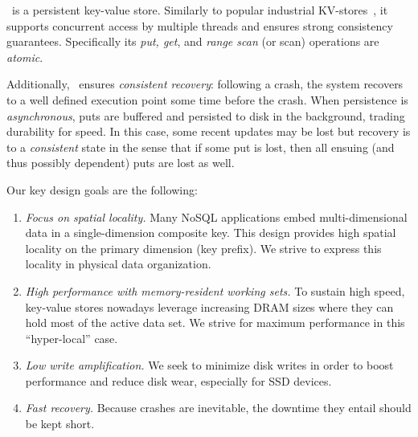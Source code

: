 \sys\ is a persistent key-value store. Similarly to popular industrial KV-stores~\cite{hbase,leveldb,RocksDB}, 
 it supports concurrent access by multiple threads and ensures 
strong consistency guarantees. 
Specifically its \emph{put, get}, and \emph{range scan} (or scan) operations are \emph{atomic}.  

Additionally, \sys\ ensures \emph{consistent recovery}: following a crash, the system recovers to a well defined execution 
point some time before the crash. 
When persistence is \emph{asynchronous}, puts are buffered and persisted to disk in the background,  
 trading durability for speed. In this case, some recent updates may be lost but 
 recovery is to a \emph{consistent} state  
in the sense that if some put is lost, then all ensuing (and thus possibly dependent) puts are lost as well.

Our key design goals are the following:
\begin{enumerate}
\itemsep0pt
\item \emph{Focus on spatial locality.}
 Many NoSQL applications embed multi-dimensional data in a single-dimension composite key. 
 This design provides high spatial locality on the primary dimension (key prefix). We strive
 to express this locality in physical data organization.
 
\item \emph{High performance  with memory-resident working sets.}
To sustain high speed, key-value stores nowadays leverage increasing DRAM sizes 
where they can hold most of the active data set. We strive for maximum performance 
in this ``hyper-local'' case.

\item \emph{Low write amplification.} We seek to minimize disk writes in order to boost performance 
and reduce disk wear, especially for SSD devices. 

\item \emph{Fast recovery.}  Because crashes are inevitable, 
the downtime they entail should be kept  short. 
\end{enumerate}

